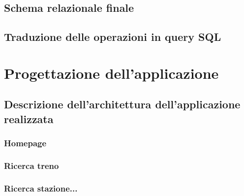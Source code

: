 \documentclass[a4paper,12pt]{report}
\begin{document}
	\section{Schema relazionale finale}
	\section{Traduzione delle operazioni in query SQL}
	\chapter{Progettazione dell'applicazione}
	\section{Descrizione dell'architettura dell'applicazione realizzata}
	\subsection{Homepage}
	\subsection{Ricerca treno}
	\subsection{Ricerca stazione...}
\end{document}
